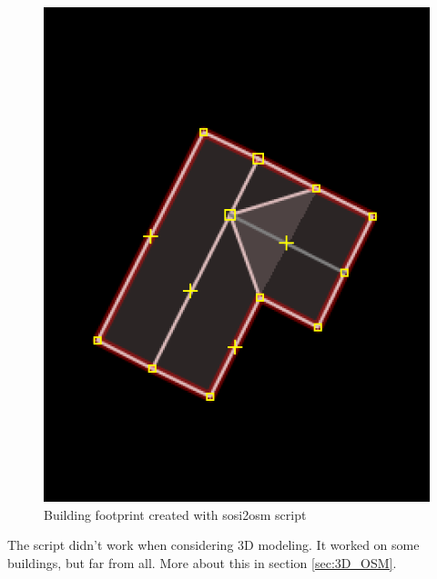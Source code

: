 \begin{figure}[H]
    \centering
    \includegraphics[scale=0.6]{figures/FixedByMe/2Doutlinesosi2osm.png}
    \caption{Building footprint created with sosi2osm script} 
    \label{fig:2D_sosi2osm}
\end{figure}

The script didn't work when considering 3D modeling. It worked on some buildings, but far from all. More about this in section \ref{sec:3D_OSM}.

